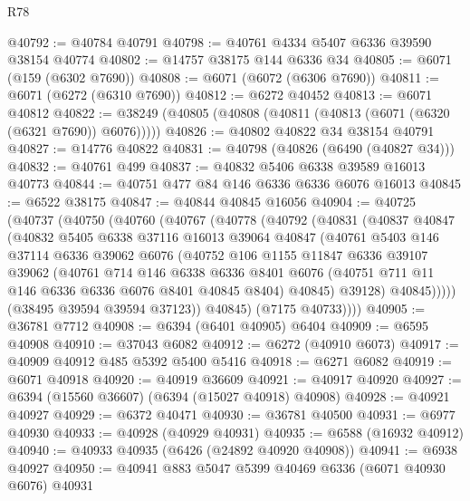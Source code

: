 \begin{lexlean}{R78}
\begin{coremodule}
@40792 := @40784 @40791
@40798 := @40761 @4334 @5407 @6336 @39590 @38154 @40774
@40802 := @14757 @38175 @144 @6336 @34
@40805 := @6071 (@159 (@6302 @7690))
@40808 := @6071 (@6072 (@6306 @7690))
@40811 := @6071 (@6272 (@6310 @7690))
@40812 := @6272 @40452
@40813 := @6071 @40812
@40822 := @38249 (@40805 (@40808 (@40811 (@40813 (@6071 (@6320 (@6321 @7690)) @6076)))))
@40826 := @40802 @40822 @34 @38154 @40791
@40827 := @14776 @40822
@40831 := @40798 (@40826 (@6490 (@40827 @34)))
@40832 := @40761 @499
@40837 := @40832 @5406 @6338 @39589 @16013 @40773
@40844 := @40751 @477 @84 @146 @6336 @6336 @6076 @16013
@40845 := @6522 @38175
@40847 := @40844 @40845 @16056
@40904 := @40725
    (@40737
      (@40750
        (@40760
          (@40767
            (@40778
              (@40792
                (@40831
                  (@40837
                    @40847
                    (@40832
                      @5405
                      @6338
                      @37116
                      @16013
                      @39064
                      @40847
                      (@40761
                        @5403
                        @146
                        @37114
                        @6336
                        @39062
                        @6076
                        (@40752
                          @106
                          @1155
                          @11847
                          @6336
                          @39107
                          @39062
                          (@40761
                            @714
                            @146
                            @6338
                            @6336
                            @8401
                            @6076
                            (@40751 @711 @11 @146 @6336 @6336 @6076 @8401 @40845 @8404)
                            @40845)
                          @39128)
                        @40845)))))
              (@38495 @39594 @39594 @37123))
            @40845)
          (@7175 @40733))))
@40905 := @36781 @7712
@40908 := @6394 (@6401 @40905) @6404
@40909 := @6595 @40908
@40910 := @37043 @6082
@40912 := @6272 (@40910 @6073)
@40917 := @40909 @40912 @485 @5392 @5400 @5416
@40918 := @6271 @6082
@40919 := @6071 @40918
@40920 := @40919 @36609
@40921 := @40917 @40920
@40927 := @6394 (@15560 @36607) (@6394 (@15027 @40918) @40908)
@40928 := @40921 @40927
@40929 := @6372 @40471
@40930 := @36781 @40500
@40931 := @6977 @40930
@40933 := @40928 (@40929 @40931)
@40935 := @6588 (@16932 @40912)
@40940 := @40933 @40935 (@6426 (@24892 @40920 @40908))
@40941 := @6938 @40927
@40950 := @40941 @883 @5047 @5399 @40469 @6336 (@6071 @40930 @6076) @40931

\end{coremodule}
\end{lexlean}
